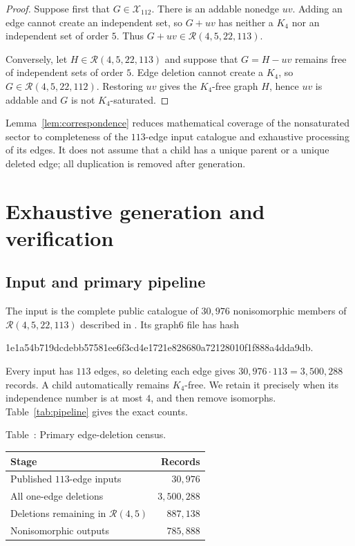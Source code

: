 \documentclass[10pt]{article}
\theoremstyle{definition}
\theoremstyle{remark}
\newcommand{\Rcal}{\mathcal{R}}
\newcommand{\Xcal}{\mathcal{X}}
\begin{document}
\begin{proof}
Suppose first that $G\in\Xcal_{112}$.  There is an addable nonedge $uv$.
Adding an edge cannot create an independent set, so $G+uv$ has neither a
$K_4$ nor an independent set of order $5$.  Thus
$G+uv\in\Rcal(4,5,22,113)$.

Conversely, let $H\in\Rcal(4,5,22,113)$ and suppose that $G=H-uv$ remains
free of independent sets of order $5$.  Edge deletion cannot create a
$K_4$, so $G\in\Rcal(4,5,22,112)$.  Restoring $uv$ gives the $K_4$-free
graph $H$, hence $uv$ is addable and $G$ is not $K_4$-saturated.
\end{proof}

Lemma~\ref{lem:correspondence} reduces mathematical coverage of the
nonsaturated sector to completeness of the $113$-edge input catalogue and
exhaustive processing of its edges.  It does not assume that a child has a
unique parent or a unique deleted edge; all duplication is removed after
generation.

\section{Exhaustive generation and verification}

\subsection{Input and primary pipeline}

The input is the complete public catalogue of $30{,}976$ nonisomorphic
members of $\Rcal(4,5,22,113)$ described in
\cite{angeltveit-mckay-2026,catalogue}.  Its graph6 file has hash
\begin{center}
\small\ttfamily
1e1a54b719dcdebb57581ee6f3cd4e1721e828680a72128010f1f888a4dda9db.
\end{center}
Every input has $113$ edges, so deleting each edge gives
$30{,}976\cdot113=3{,}500{,}288$ records.  A child automatically remains
$K_4$-free.  We retain it precisely when its independence number is at most
$4$, and then remove isomorphs.  Table~\ref{tab:pipeline} gives the exact
counts.

\begin{center}
Table~\thetable: Primary edge-deletion census.\label{tab:pipeline}\par\smallskip
\begin{tabular}{lr}
\toprule
Stage & Records \\
\midrule
Published $113$-edge inputs & $30{,}976$ \\
All one-edge deletions & $3{,}500{,}288$ \\
Deletions remaining in $\Rcal(4,5)$ & $887{,}138$ \\
Nonisomorphic outputs & $785{,}888$ \\
\bottomrule
\end{tabular}
\end{center}
\end{document}
